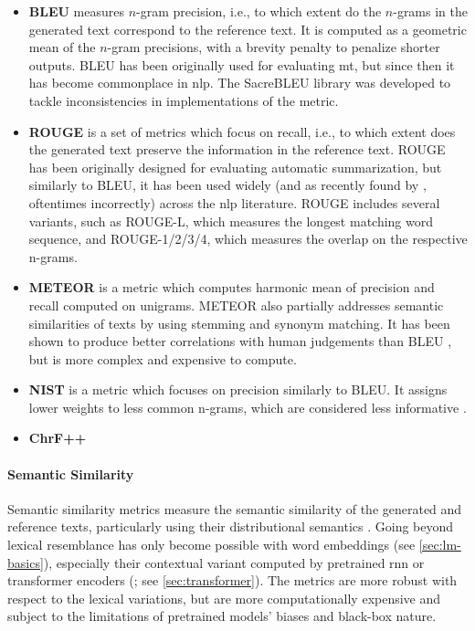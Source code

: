 \begin{itemize}
    \item \textbf{BLEU} \cite{papineni2002bleu} measures $n$-gram precision, i.e., to which extent do the $n$-grams in the generated text correspond to the reference text.  It is computed as a geometric mean of the $n$-gram precisions, with a brevity penalty to penalize shorter outputs. BLEU has been originally used for evaluating \ac{mt}, but since then it has become commonplace in \ac{nlp}. The SacreBLEU library \cite{post2018call}  was developed to tackle inconsistencies in implementations of the metric.
    \item \textbf{ROUGE} \cite{lin-2004-rouge} is a set of metrics which focus on recall, i.e., to which extent does the generated text preserve the information in the reference text. ROUGE has been originally designed for evaluating automatic summarization, but similarly to BLEU, it has been used widely (and as recently found by \citet{gruskyRogueScores2023}, oftentimes incorrectly) across the \ac{nlp} literature. ROUGE includes several variants, such as ROUGE-L, which measures the longest matching word sequence, and ROUGE-{1/2/3/4}, which measures the overlap on the respective n-grams.
    \item \textbf{METEOR} \cite{banerjee-lavie-2005-meteor} is a metric which computes harmonic mean of precision and recall computed on unigrams. METEOR also partially addresses semantic similarities of texts by using stemming and synonym matching. It has been shown to produce better correlations with human judgements than BLEU \cite{agarwal2008meteor}, but is more complex and expensive to compute.
    \item \textbf{NIST} \cite{martin2000nist} is a metric which focuses on precision similarly to BLEU. It assigns lower weights to less common n-grams, which are considered less informative \cite{doddington2002automatic}.
    \item \textbf{ChrF++}
\end{itemize}
\paragraph{Semantic Similarity} Semantic similarity metrics measure the semantic similarity of the generated and reference texts, particularly using their distributional semantics . Going beyond lexical resemblance has only become possible with word embeddings (see \autoref{sec:lm-basics}), especially their contextual variant computed by pretrained \ac{rnn} or transformer encoders (\citealp{peters2018deep,devlinBERTPretrainingDeep2019}; see \autoref{sec:transformer}). The metrics are more robust with respect to the lexical variations, but are more computationally expensive and subject to the limitations of pretrained models' biases and black-box nature.

